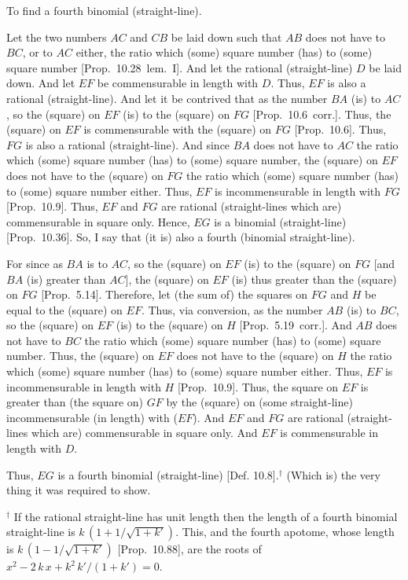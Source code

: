 \begin{Parallel}{}{}
{To find a fourth binomial (straight-line).

\epsfysize=1.2in
\centerline{}

Let the two numbers $AC$ and $CB$ be laid down such that $AB$ does not have to $BC$,  or to $AC$ either, the ratio which (some) square number
(has) to (some) square number [Prop.~10.28~lem.~I].
And let the rational (straight-line) $D$ be laid down. And let $EF$ be
commensurable in length with $D$. Thus, $EF$ is also a rational (straight-line). And let it be contrived that as the number $BA$ (is) to
$AC$, so the (square) on $EF$ (is) to the (square) on $FG$ [Prop.~10.6~corr.]. Thus, the (square) on $EF$
is commensurable with the (square) on $FG$ [Prop.~10.6]. Thus, $FG$ is also a rational (straight-line). And since $BA$ does not have to $AC$ the ratio which (some)
square number (has) to (some) square number,  the (square) on $EF$
does not have to the (square) on $FG$ the ratio which (some) square number
(has) to (some) square number either. Thus, $EF$ is incommensurable in length with $FG$ [Prop.~10.9]. Thus, $EF$ and
$FG$ are rational (straight-lines which are) commensurable in square only.
Hence, $EG$ is a binomial (straight-line) [Prop.~10.36]. So, I say that (it is) also
a fourth (binomial straight-line).

For since as $BA$ is to $AC$, so the (square) on $EF$ (is) to the (square) on
$FG$ [and $BA$ (is) greater than $AC$], the (square) on $EF$ (is) thus
greater than the (square) on $FG$ [Prop.~5.14]. Therefore, let (the sum of) the squares on
$FG$ and $H$ be equal to the (square) on $EF$. Thus, via conversion,
as the number $AB$ (is) to $BC$, so the (square) on $EF$ (is) to the
(square) on $H$ [Prop.~5.19~corr.]. And $AB$
does not have to $BC$ the ratio which (some) square number (has) to (some)
square number. Thus, the (square) on $EF$ does not have to the
(square) on $H$ the ratio which (some) square number (has) to (some) square
number either. Thus, $EF$ is incommensurable in length with $H$ [Prop.~10.9]. Thus, the square on $EF$ is greater than (the square on) $GF$ by the (square) on (some straight-line)
incommensurable (in length) with ($EF$). And $EF$ and $FG$ are rational (straight-lines which are) commensurable in square only.  And $EF$ is commensurable
in length with $D$.

Thus, $EG$ is a fourth binomial (straight-line) [Def. 10.8].$^\dag$ (Which is) the very thing
it was required to show.}
\end{Parallel}
{\footnotesize\noindent $^\dag$ If the rational straight-line has unit length then the length of a fourth binomial straight-line
is  $k\,(1+1/\sqrt{1+k'})$. This, and the fourth apotome,
whose length is $k\,(1-1/\sqrt{1+k'})$ [Prop.~10.88],
are the roots of $x^2- 2\,k\,x+k^2\,k'/(1+k')=0$.}

